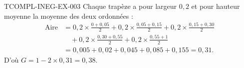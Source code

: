 \begin{corrige}{TCOMPL-INEG-EX-003}
Chaque trapèze a pour largeur $0{,}2$ et pour hauteur moyenne la moyenne des deux ordonnées :
\[
\begin{aligned}
\text{Aire} &= 0{,}2\times\frac{0+0{,}05}{2} + 0{,}2\times\frac{0{,}05+0{,}15}{2} + 0{,}2\times\frac{0{,}15+0{,}30}{2} \\
            &\quad + 0{,}2\times\frac{0{,}30+0{,}55}{2} + 0{,}2\times\frac{0{,}55+1}{2} \\
            &= 0{,}005+0{,}02+0{,}045+0{,}085+0{,}155 = 0{,}31.
\end{aligned}
\]
D'où $G = 1-2\times0{,}31 = 0{,}38$.
\end{corrige}
